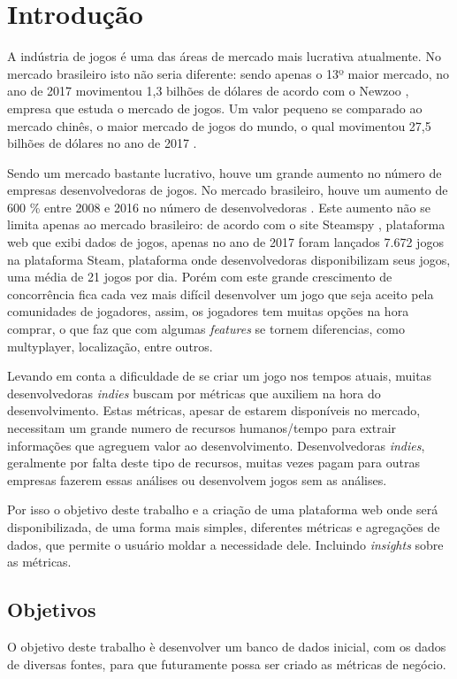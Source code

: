 \chapter[Introdução]{Introdução}
A indústria de jogos é uma das áreas de mercado mais lucrativa atualmente. No mercado brasileiro isto não seria diferente: sendo apenas o 13º maior mercado, no ano de 2017 movimentou 1,3 bilhões de dólares de acordo com o Newzoo \cite{newzoo_brasil}, empresa que estuda o mercado de jogos. Um valor pequeno se comparado ao mercado chinês, o maior mercado de jogos do mundo, o qual movimentou 27,5 bilhões de dólares no ano de 2017 \cite{newzoo_china}.

Sendo um mercado bastante lucrativo, houve um grande aumento no número de empresas desenvolvedoras de jogos. No mercado brasileiro, houve um aumento de 600 \% entre 2008 e 2016 no número de desenvolvedoras \cite{desenvolvedoras_crescimento}. Este aumento não se limita apenas ao mercado brasileiro: de acordo com o site Steamspy \cite{steam_spy}, plataforma web que exibi dados de jogos, apenas no ano de 2017 foram lançados 7.672 jogos na plataforma Steam, plataforma onde desenvolvedoras disponibilizam seus jogos, uma média de 21 jogos por dia. Porém com este grande crescimento de concorrência fica cada vez mais difícil desenvolver um jogo que seja aceito pela comunidades de jogadores, assim, os jogadores tem muitas opções na hora comprar, o que faz que com algumas \textit{features} se tornem diferencias, como multyplayer, localização, entre outros.

Levando em conta a dificuldade de se criar um jogo nos tempos atuais, muitas desenvolvedoras \textit{indies} buscam por métricas que auxiliem na hora do desenvolvimento. Estas métricas, apesar de estarem disponíveis no mercado, necessitam um grande numero de recursos humanos/tempo para extrair informações que agreguem valor ao desenvolvimento. Desenvolvedoras \textit{indies}, geralmente por falta deste tipo de recursos, muitas vezes pagam para outras empresas fazerem essas análises ou desenvolvem jogos sem as análises. 

Por isso o objetivo deste trabalho e a criação de uma plataforma web onde será disponibilizada, de uma forma mais simples, diferentes métricas e agregações de dados, que permite o usuário moldar a necessidade dele. Incluindo \textit{insights} sobre as métricas.

\section{Objetivos}
	O objetivo deste trabalho è desenvolver um banco de dados inicial, com os dados de diversas fontes, para que futuramente possa ser criado as métricas de negócio.
	
